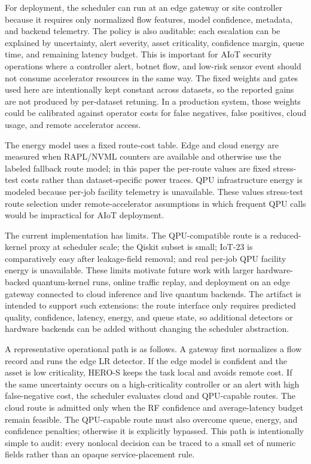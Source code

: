 \documentclass[conference]{IEEEtran}
\begin{document}
For deployment, the scheduler can run at an edge gateway or site controller because it requires only normalized flow features, model confidence, metadata, and backend telemetry. The policy is also auditable: each escalation can be explained by uncertainty, alert severity, asset criticality, confidence margin, queue time, and remaining latency budget. This is important for AIoT security operations where a controller alert, botnet flow, and low-risk sensor event should not consume accelerator resources in the same way. The fixed weights and gates used here are intentionally kept constant across datasets, so the reported gains are not produced by per-dataset retuning. In a production system, those weights could be calibrated against operator costs for false negatives, false positives, cloud usage, and remote accelerator access.

The energy model uses a fixed route-cost table. Edge and cloud energy are measured when RAPL/NVML counters are available and otherwise use the labeled fallback route model; in this paper the per-route values are fixed stress-test costs rather than dataset-specific power traces. QPU infrastructure energy is modeled because per-job facility telemetry is unavailable. These values stress-test route selection under remote-accelerator assumptions in which frequent QPU calls would be impractical for AIoT deployment.

The current implementation has limits. The QPU-compatible route is a reduced-kernel proxy at scheduler scale; the Qiskit subset is small; IoT-23 is comparatively easy after leakage-field removal; and real per-job QPU facility energy is unavailable. These limits motivate future work with larger hardware-backed quantum-kernel runs, online traffic replay, and deployment on an edge gateway connected to cloud inference and live quantum backends. The artifact is intended to support such extensions: the route interface only requires predicted quality, confidence, latency, energy, and queue state, so additional detectors or hardware backends can be added without changing the scheduler abstraction.

A representative operational path is as follows. A gateway first normalizes a flow record and runs the edge LR detector. If the edge model is confident and the asset is low criticality, HERO-S keeps the task local and avoids remote cost. If the same uncertainty occurs on a high-criticality controller or an alert with high false-negative cost, the scheduler evaluates cloud and QPU-capable routes. The cloud route is admitted only when the RF confidence and average-latency budget remain feasible. The QPU-capable route must also overcome queue, energy, and confidence penalties; otherwise it is explicitly bypassed. This path is intentionally simple to audit: every nonlocal decision can be traced to a small set of numeric fields rather than an opaque service-placement rule.
\end{document}
